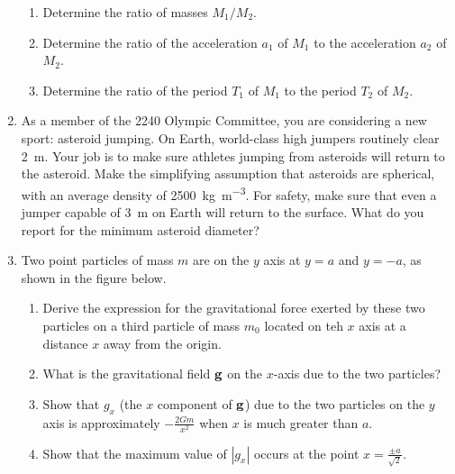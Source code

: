 \documentclass{../../oss-apphys}
\begin{document}
\begin{enumerate}[leftmargin=15pt]
\begin{center}
\begin{tikzpicture}[scale=0.8]
    \end{tikzpicture}
  \end{center}
  \begin{enumerate}[noitemsep,leftmargin=20pt]
  \item Determine the ratio of masses $M_1/M_2$.
  \item Determine the ratio of the acceleration $a_1$ of $M_1$ to the
    acceleration $a_2$ of $M_2$.
  \item Determine the ratio of the period $T_1$ of $M _1$ to the period $T_2$
    of $M_2$.
  \end{enumerate}
  \vspace{2.2in}
  
\item As a member of the 2240 Olympic Committee, you are considering a new
  sport: asteroid jumping. On Earth, world-class high jumpers routinely clear
  \SI{2}{\metre}. Your job is to make sure athletes jumping from asteroids will
  return to the asteroid. Make the simplifying assumption that asteroids are
  spherical, with an average density of \SI{2500}{\kilo\gram\per\metre^3}. For
  safety, make sure that even a jumper capable of \SI{3}{\metre} on Earth will
  return to the surface. What do you report for the minimum asteroid diameter?
  \newpage

\item Two point particles of mass $m$ are on the $y$ axis at $y=a$ and $y=-a$,
  as shown in the figure below.
  \begin{center}
  \end{center}
  \begin{enumerate}[noitemsep,leftmargin=20pt]
  \item Derive the expression for the gravitational force exerted by these two
    particles on a third particle of mass $m_0$ located on teh $x$ axis at a
    distance $x$ away from the origin.
  \item What is the gravitational field $\mb{g}$ on the $x$-axis due to the
    two particles?
  \item Show that $g_x$ (the $x$ component of $\mb{g}$) due to the two
    particles on the $y$ axis is approximately $\displaystyle-\frac{2Gm}{x^2}$
    when $x$ is much greater than $a$.
  \item Show that the maximum value of $|g_x|$ occurs at the point
    $\displaystyle x=\frac{\pm a}{\sqrt{2}}$.
  \end{enumerate}
  \newpage


\end{enumerate}
\end{document}
